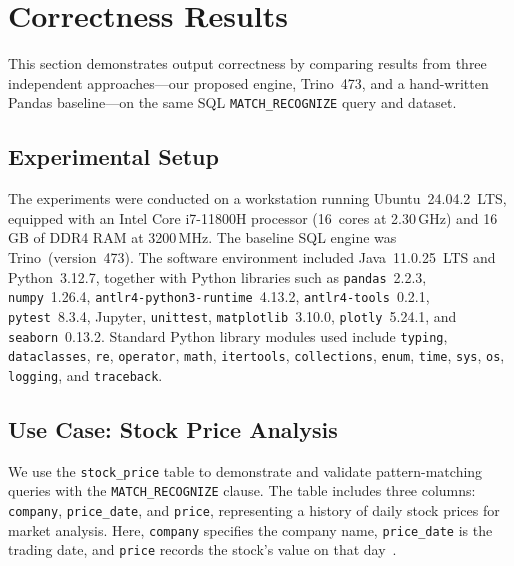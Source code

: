 \section{Correctness Results}
\label{sec:eval-correctness}

This section demonstrates output correctness by comparing results from
three independent approaches---our proposed engine, Trino~473, and a
hand-written Pandas baseline---on the same SQL \texttt{MATCH\_RECOGNIZE}
query and dataset.

\subsection{Experimental Setup}
\label{subsec:correctness-setup}

The experiments were conducted on a workstation running Ubuntu~24.04.2~LTS,
equipped with an Intel Core i7-11800H processor (16~cores at 2.30\,GHz)
and 16\,GB of DDR4 RAM at 3200\,MHz.  The baseline SQL engine was
Trino~(version~473).  The software environment included Java~11.0.25~LTS
and Python~3.12.7, together with Python libraries such as
\texttt{pandas}~2.2.3, \texttt{numpy}~1.26.4,
\texttt{antlr4-python3-runtime}~4.13.2, \texttt{antlr4-tools}~0.2.1,
\texttt{pytest}~8.3.4, Jupyter, \texttt{unittest},
\texttt{matplotlib}~3.10.0, \texttt{plotly}~5.24.1, and
\texttt{seaborn}~0.13.2.  Standard Python library modules used
include \texttt{typing}, \texttt{dataclasses}, \texttt{re},
\texttt{operator}, \texttt{math}, \texttt{itertools},
\texttt{collections}, \texttt{enum}, \texttt{time}, \texttt{sys},
\texttt{os}, \texttt{logging}, and \texttt{traceback}.

\subsection{Use Case: Stock Price Analysis}
\label{sec:queries}

We use the \texttt{stock\_price} table to demonstrate and validate
pattern-matching queries with the \texttt{MATCH\_RECOGNIZE} clause.
The table includes three columns: \texttt{company}, \texttt{price\_date},
and \texttt{price}, representing a history of daily stock prices for
market analysis.  Here, \texttt{company} specifies the company name,
\texttt{price\_date} is the trading date, and \texttt{price} records
the stock's value on that day~\cite{petkovic2022rpr}.

